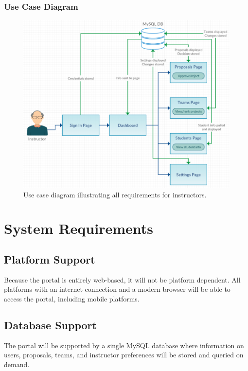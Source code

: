 \documentclass[12pt]{article}
\begin{document}
\subsubsection{Use Case Diagram}
\begin{figure}[!htb]
	\includegraphics[width=\linewidth]{instructor.png}
	\caption{Use case diagram illustrating all requirements for instructors.}
	\label{fig:instructor}
\end{figure}
\FloatBarrier

\section{System Requirements}

\subsection{Platform Support}

Because the portal is entirely web-based, it will not be platform dependent. All platforms with an internet connection and a modern browser will be able to access the portal, including mobile platforms.

\subsection{Database Support}

The portal will be supported by a single MySQL database where information on users, proposals, teams, and instructor preferences will be stored and queried on demand.
\end{document}
